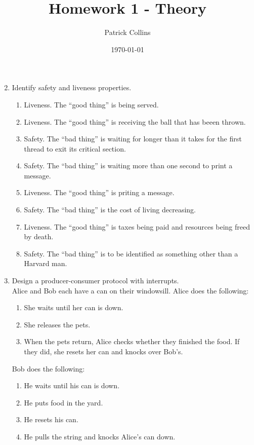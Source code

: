 \documentclass{article}
\begin{document}
\title{Homework 1 - Theory}
\author{Patrick Collins}
\date{\today}
\maketitle

\begin{enumerate}
\setcounter{enumi}{1}
\item Identify safety and liveness properties. 
  \begin{enumerate}
  \item Liveness. The ``good thing'' is being served.
  \item Liveness. The ``good thing'' is receiving the ball that has
    beeen thrown.
  \item Safety. The ``bad thing'' is waiting for longer than it takes
    for the first thread to exit its critical section.
  \item Safety. The ``bad thing'' is waiting more than one second to
    print a message.
  \item Liveness. The ``good thing'' is priting a message.
  \item Safety. The ``bad thing'' is the cost of living decreasing.
  \item Liveness. The ``good thing'' is taxes being paid and resources
    being freed by death.
  \item Safety. The ``bad thing'' is to be identified as something
    other than a Harvard man.
  \end{enumerate}

\item Design a producer-consumer protocol with interrupts. \\
Alice and Bob each have a can on their windowsill. Alice does the following:
\begin{enumerate}
\item She waits until her can is down.
\item She releases the pets.
\item When the pets return, Alice checks whether they finished the
  food. If they did, she resets her can and knocks over Bob's.\\
\end{enumerate}
Bob does the following:
\begin{enumerate}
\item He waits until his can is down.
\item He puts food in the yard.
\item He resets his can.
\item He pulls the string and knocks Alice's can down.
\end{enumerate}


\end{enumerate}
\end{document}
